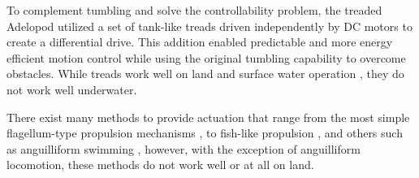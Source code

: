 To complement tumbling and solve the controllability problem, the treaded Adelopod \cite{Hemes2011a} utilized a set of tank-like treads driven independently by DC motors to create a differential drive. This addition enabled predictable and more energy efficient motion control while using the original tumbling capability to overcome obstacles. While treads work well on land and surface water operation \cite{Kline2012}, they do not work well underwater. 




There exist many methods to provide actuation that range from the most simple flagellum-type propulsion mechanisms \cite{Regnier2014,Dhariwal2004, Edd2003}, to fish-like propulsion \cite{Yu2018,Massey1984}, and others such as anguilliform swimming \cite{Zhou2011}, however, with the exception of anguilliform locomotion, these methods do not work well or at all on land. %


